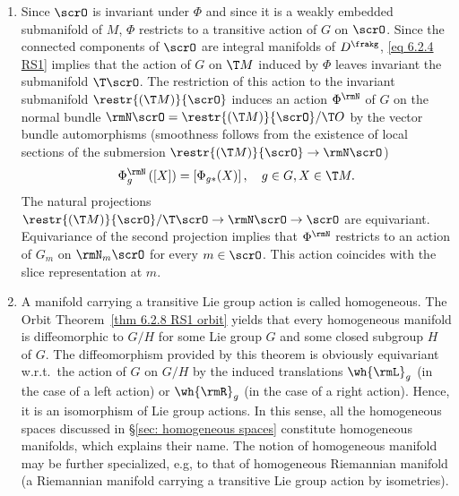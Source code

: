 \begin{rem}[{{\cite[Rem.~6.2.10]{RS1}}}]
\begin{enumerate}
        On the other hand, the isotropy representation restricted to $\T_m\scrO$ can be brought to the following normal form. By the Orbit Theorem~\ref{thm 6.2.8 RS1 orbit}, the map $\Phi^m_{\ast e}:\frakg\to \T_mM$ has image $\T_m\scrO$. By point 3 of Proposition~\ref{prop 6.2.2 RS1} it has kernel $\frakg_m$. Hence, this mapping induces a natural vector space isomorphism
        \[\T_m\scrO\cong \frakg\slash\frakg_m.\]
        In view of \eqref{eq 6.2.1 RS1}, this implies that this isomorphism intertwines the representation of $G_m$ on $\frakg\slash\frakg_m$ induced by the adjoint representation with the isotropy representation on $\T_m\scrO$.
        \item Since $\scrO$ is invariant under $\Phi$ and since it is a weakly embedded submanifold of $M$, $\Phi$ restricts to a transitive action of $G$ on $\scrO$. Since the connected components of $\scrO$ are integral manifolds of $D^\frakg$, \eqref{eq 6.2.4 RS1} implies that the action of $G$ on $\T M$ induced by $\Phi$ leaves invariant the submanifold $\T \scrO$. The restriction of this action to the invariant submanifold $\restr{(\T M)}{\scrO}$ induces an action $\Phi^\rmN$ of $G$ on the normal bundle $\rmN \scrO=\restr{(\T M)}{\scrO}\slash \T O$ by the vector bundle automorphisms (smoothness follows from the existence of local sections of the submersion $\restr{(\T M)}{\scrO}\to \rmN \scrO$)
        \[\Phi_g^\rmN\left([X]\right)=\left[\Phi_{g\ast}(X)\right],\quad g\in G,X\in \T M.\]
        The natural projections $\restr{(\T M)}{\scrO}\slash \T \scrO\to \rmN \scrO\to \scrO$ are equivariant. Equivariance of the second projection implies that $\Phi^\rmN$ restricts to an action of $G_m$ on $\rmN_m\scrO$ for every $m\in \scrO$. This action coincides with the slice representation at $m$.
        \item A manifold carrying a transitive Lie group action is called homogeneous. The Orbit Theorem~\ref{thm 6.2.8 RS1 orbit} yields that every homogeneous manifold is diffeomorphic to $G\slash H$ for some Lie group $G$ and some closed subgroup $H$ of $G$. The diffeomorphism provided by this theorem is obviously equivariant w.r.t.\ the action of $G$ on $G\slash H$ by the induced translations $\wh{\rmL}_g$ (in the case of a left action) or $\wh{\rmR}_g$ (in the case of a right action). Hence, it is an isomorphism of Lie group actions. In this sense, all the homogeneous spaces discussed in \S\ref{sec: homogeneous spaces} constitute homogeneous manifolds, which explains their name. The notion of homogeneous manifold may be further specialized, e.g, to that of homogeneous Riemannian manifold (a Riemannian manifold carrying a transitive Lie group action by isometries).
    \end{enumerate}
\end{rem}


